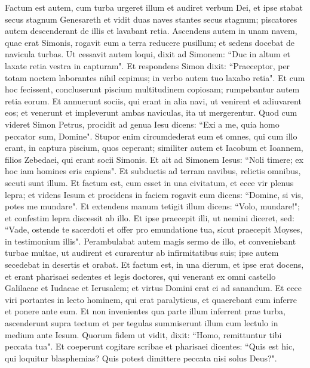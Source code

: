 \begin{biblechapter}  
\verse Factum est autem, cum turba urgeret illum et audiret verbum Dei, et ipse stabat secus stagnum Genesareth 
\verse et vidit duas naves stantes secus stagnum; piscatores autem descenderant de illis et lavabant retia. 
\verse Ascendens autem in unam navem, quae erat Simonis, rogavit eum a terra reducere pusillum; et sedens docebat de navicula turbas. 
\verse Ut cessavit autem loqui, dixit ad Simonem: “Duc in altum et laxate retia vestra in capturam". 
\verse Et respondens Simon dixit: “Praeceptor, per totam noctem laborantes nihil cepimus; in verbo autem tuo laxabo retia". 
\verse Et cum hoc fecissent, concluserunt piscium multitudinem copiosam; rumpebantur autem retia eorum. 
\verse Et annuerunt sociis, qui erant in alia navi, ut venirent et adiuvarent eos; et venerunt et impleverunt ambas naviculas, ita ut mergerentur. 
\verse Quod cum videret Simon Petrus, procidit ad genua Iesu dicens: “Exi a me, quia homo peccator sum, Domine". 
\verse Stupor enim circumdederat eum et omnes, qui cum illo erant, in captura piscium, quos ceperant; 
\verse similiter autem et Iacobum et Ioannem, filios Zebedaei, qui erant socii Simonis. Et ait ad Simonem Iesus: “Noli timere; ex hoc iam homines eris capiens". 
\verse Et subductis ad terram navibus, relictis omnibus, secuti sunt illum. 
\verse Et factum est, cum esset in una civitatum, et ecce vir plenus lepra; et videns Iesum et procidens in faciem rogavit eum dicens: “Domine, si vis, potes me mundare". 
\verse Et extendens manum tetigit illum dicens: “Volo, mundare!"; et confestim lepra discessit ab illo. 
\verse Et ipse praecepit illi, ut nemini diceret, sed: “Vade, ostende te sacerdoti et offer pro emundatione tua, sicut praecepit Moyses, in testimonium illis". 
\verse Perambulabat autem magis sermo de illo, et conveniebant turbae multae, ut audirent et curarentur ab infirmitatibus suis; 
\verse ipse autem secedebat in desertis et orabat. 
\verse Et factum est, in una dierum, et ipse erat docens, et erant pharisaei sedentes et legis doctores, qui venerant ex omni castello Galilaeae et Iudaeae et Ierusalem; et virtus Domini erat ei ad sanandum. 
\verse Et ecce viri portantes in lecto hominem, qui erat paralyticus, et quaerebant eum inferre et ponere ante eum. 
\verse Et non invenientes qua parte illum inferrent prae turba, ascenderunt supra tectum et per tegulas summiserunt illum cum lectulo in medium ante Iesum. 
\verse Quorum fidem ut vidit, dixit: “Homo, remittuntur tibi peccata tua".  
\verse Et coeperunt cogitare scribae et pharisaei dicentes: “Quis est hic, qui loquitur blasphemias? Quis potest dimittere peccata nisi solus Deus?". 

\end{biblechapter}
